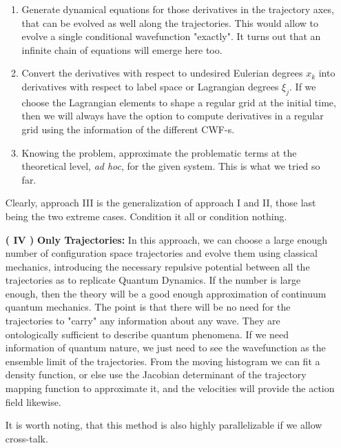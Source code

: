 \documentclass[11pt, a4paper]{article} %
\begin{document}
\begin{enumerate}
\begin{enumerate}
\item Generate dynamical equations for those derivatives in the trajectory axes, that can be evolved as well along the trajectories. This would allow to evolve a single conditional wavefunction "exactly". It turns out that an infinite chain of equations will emerge here too.

\item Convert the derivatives with respect to undesired Eulerian degrees $x_k$ into derivatives with respect to label space or Lagrangian degrees $\xi_j$. If we choose the Lagrangian elements to shape a regular grid at the initial time, then we will always have the option to compute derivatives in a regular grid using the information of the different CWF-s.

\item Knowing the problem, approximate the problematic terms at the theoretical level, {\em ad hoc}, for the given system. This is what we tried so far.
\end{enumerate}

Clearly, approach III is the generalization of approach I and II, those last being the two extreme cases. Condition it all or condition nothing.

\item [\bf ( IV )] {\bf Only Trajectories:} In this approach, we can choose a large enough number of configuration space trajectories and evolve them using classical mechanics, introducing the necessary repulsive potential between all the trajectories as to replicate Quantum Dynamics. If the number is large enough, then the theory will be a good enough approximation of continuum quantum mechanics. The point is that there will be no need for the trajectories to "carry" any information about any wave. They are ontologically sufficient to describe quantum phenomena. If we need information of quantum nature, we just need to see the wavefunction as the ensemble limit of the trajectories. From the moving histogram we can fit a density function, or else use the Jacobian determinant of the trajectory mapping function to approximate it, and the velocities will provide the action field likewise.

It is worth noting, that this method is also highly parallelizable if we allow cross-talk.

\end{enumerate}

\end{document}
